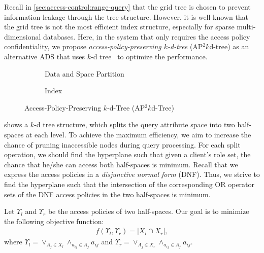 Recall in \cref{sec:access-control:range-query} that the grid tree is chosen to prevent information leakage through the tree structure. However, it is well known that the grid tree is not the most efficient index structure, especially for sparse multi-dimensional databases. Here, in the system that only requires the access policy confidentiality, we propose \emph{access-policy-preserving $k$-d-tree} (AP$^2k$d-tree) as an alternative ADS that uses $k$-d tree~\cite{10.1145/361002.361007} to optimize the performance.

\begin{figure}[t]
    \centering
    \begin{subfigure}[b]{\linewidth}
        \centering
        \resizebox{.7\linewidth}{!}{}
        \caption{Data and Space Partition}\label{fig:access-control:access-kd-tree-struct}
    \end{subfigure}
    \begin{subfigure}[b]{\linewidth}
        \centering
        \resizebox{.7\linewidth}{!}{}
        \caption{Index}\label{fig:access-control:access-kd-tree-index}
    \end{subfigure}
    \caption{Access-Policy-Preserving $k$-d-Tree (AP$^2k$d-Tree)}\label{fig:access-control:access-kd-tree}
\end{figure}

 shows a $k$-d tree structure, which splits the query attribute space into two half-spaces at each level.
To achieve the maximum efficiency, we aim to increase the chance of pruning inaccessible nodes during query processing. For each split operation, we should find the hyperplane such that given a client's role set, the chance that he/she can access both half-spaces is minimum.
Recall that we express the access policies in a \emph{disjunctive normal form} (DNF).
Thus, we strive to find the hyperplane such that the intersection of the corresponding OR operator sets of the DNF access policies in the two half-spaces is minimum.

Let $\Upsilon_l$ and $\Upsilon_r$ be the access policies of two half-spaces. Our goal is to minimize the following objective function:
\begin{align*}
    f(\Upsilon_l, \Upsilon_r) = |X_l \cap X_r|,
\end{align*}
where $\Upsilon_l = \lor_{A_j \in X_l}\land_{a_{ij} \in A_j} a_{ij}$ and $\Upsilon_r = \lor_{A_j \in X_r}\land_{a_{ij} \in A_j} a_{ij}$.

